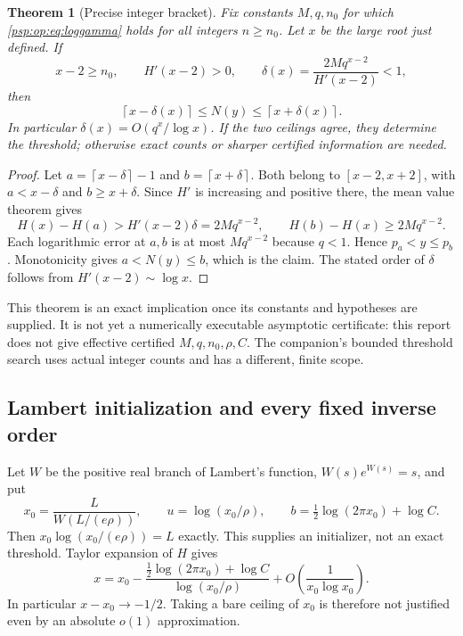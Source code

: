 \documentclass[11pt,letterpaper]{article}
\numberwithin{equation}{section}
\newtheorem{theorem}{Theorem}[section]
\theoremstyle{remark}\newtheorem{remark}[theorem]{Remark}
\newcommand{\ceil}[1]{\left\lceil#1\right\rceil}
\begin{document}
\begin{theorem}[Precise integer bracket]\label{psp:op:thm:bracket}
Fix constants $M,q,n_0$ for which \eqref{psp:op:eq:loggamma} holds for all
integers $n\geq n_0$. Let $x$ be the large root just defined. If
\begin{equation}\label{psp:op:eq:deltacond}
 x-2\geq n_0,\qquad H'(x-2)>0,\qquad
 \delta(x)=\frac{2Mq^{x-2}}{H'(x-2)}<1,
\end{equation}
then
\begin{equation}\label{psp:op:eq:ceilingbracket}
 \ceil{x-\delta(x)}\leq N(y)\leq\ceil{x+\delta(x)}.
\end{equation}
In particular $\delta(x)=O(q^x/\log x)$. If the two ceilings agree,
they determine the threshold; otherwise exact counts or sharper
certified information are needed.
\end{theorem}
\begin{proof}
Let $a=\ceil{x-\delta}-1$ and $b=\ceil{x+\delta}$.
Both belong to $[x-2,x+2]$, with $a<x-\delta$ and $b\geq x+\delta$.
Since $H'$ is increasing and positive there, the mean value theorem
gives
\[
 H(x)-H(a)>H'(x-2)\delta=2Mq^{x-2},\qquad
 H(b)-H(x)\geq2Mq^{x-2}.
\]
Each logarithmic error at $a,b$ is at most $Mq^{x-2}$ because
$q<1$. Hence $p_a<y\leq p_b$. Monotonicity gives $a<N(y)\leq b$,
which is the claim. The stated order of $\delta$ follows from
$H'(x-2)\sim\log x$.
\end{proof}

This theorem is an exact implication once its constants and
hypotheses are supplied. It is not yet a numerically executable
asymptotic certificate: this report does not give effective certified
$M,q,n_0,\rho,C$. The companion's bounded threshold search uses
actual integer counts and has a different, finite scope.

\subsection{Lambert initialization and every fixed inverse order}
Let $W$ be the positive real branch of Lambert's function,
$W(s)e^{W(s)}=s$, and put
\begin{equation}\label{psp:op:eq:xzero}
 x_0=\frac{L}{W(L/(e\rho))},\qquad
 u=\log(x_0/\rho),\qquad
 b=\tfrac12\log(2\pi x_0)+\log C.
\end{equation}
Then $x_0\log(x_0/(e\rho))=L$ exactly. This supplies an initializer,
not an exact threshold. Taylor expansion of $H$ gives
\begin{equation}\label{psp:op:eq:firstinverse}
 x=x_0-\frac{\tfrac12\log(2\pi x_0)+\log C}{\log(x_0/\rho)}
       +O\!\left(\frac1{x_0\log x_0}\right).
\end{equation}
In particular $x-x_0\to-1/2$. Taking a bare ceiling of $x_0$ is
therefore not justified even by an absolute $o(1)$ approximation.
\end{document}
